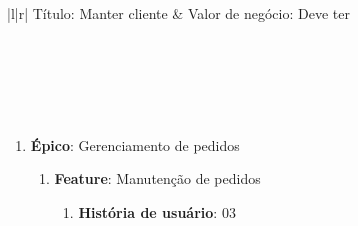 \begin{table}[!hbt]
\centering
\label{h02}
\begin{tabular}{|l|r|}
\hline
Título: Manter cliente                                                         & Valor de negócio: Deve ter                                                        \\ \hline
{}                                                                                                                        \\ \hline
{}                                                                                                   \\ \hline
{}                                                                                   \\ \hline
{} \\ \hline
{}                                                                                                                                      \\ \hline
\end{tabular}
\caption{História de usuário 02}
\end{table}

\begin{enumerate}
	\item \textbf{Épico}: Gerenciamento de pedidos
	\begin{enumerate}
		\item \textbf{Feature}: Manutenção de pedidos
		\begin{enumerate}
		\item \textbf{História de usuário}: 03
		\end{enumerate}
	\end{enumerate}
\end{enumerate}

